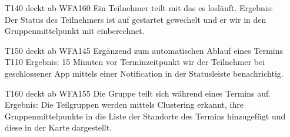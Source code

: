 \documentclass{scrartcl}
\begin{document}
\begin{itemize}
	\item [T140] deckt ab WFA160 \newline
	Ein Teilnehmer teilt mit das es losläuft.\newline
	Ergebnis: Der Status des Teilnehmers ist auf gestartet gewechelt und er wir in den Gruppenmittelpunkt mit einberechnet.

	\item[T150] deckt ab WFA145 \newline
	Ergänzend zum automatischen Ablauf eines Termins T110\newline
	Ergebnis: 15 Minuten vor Terminzeitpunkt wir der Teilnehmer bei geschlossener App mittels einer Notification in der Statusleiste benachrichtig.

	\item[T160] deckt ab WFA155 \newline
	Die Gruppe teilt sich während eines Termins auf. \newline
	Ergebnis: Die Teilgruppen werden mittels Clustering erkannt, ihre Gruppenmittelpunkte in die Liste der Standorte des Termins hinzugefügt und diese in der Karte dargestellt.
	
\end{itemize}	

\newpage
\hypertarget{Anhang}{}

\end{document}
